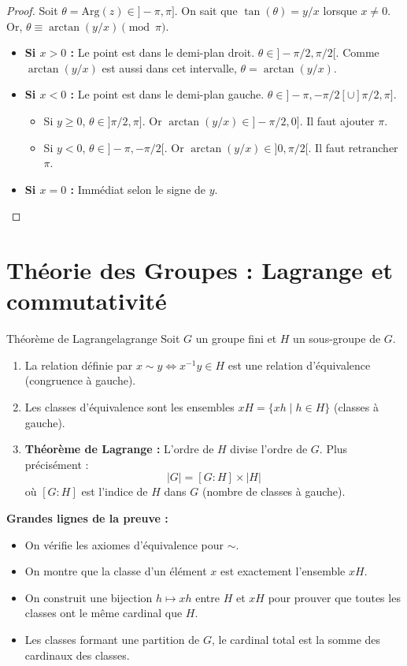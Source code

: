 \documentclass{prepacours}
\begin{document}
\begin{proof}
    Soit $\theta = \text{Arg}(z) \in ]-\pi, \pi]$. On sait que $\tan(\theta) = y/x$ lorsque $x \neq 0$.
    Or, $\theta \equiv \arctan(y/x) \pmod \pi$.
    \begin{itemize}
        \item \textbf{Si $x > 0$ :} Le point est dans le demi-plan droit. $\theta \in ]-\pi/2, \pi/2[$. Comme $\arctan(y/x)$ est aussi dans cet intervalle, $\theta = \arctan(y/x)$.
        \item \textbf{Si $x < 0$ :} Le point est dans le demi-plan gauche. $\theta \in ]-\pi, -\pi/2[ \cup ]\pi/2, \pi]$.
        \begin{itemize}
            \item Si $y \ge 0$, $\theta \in ]\pi/2, \pi]$. Or $\arctan(y/x) \in ]-\pi/2, 0]$. Il faut ajouter $\pi$.
            \item Si $y < 0$, $\theta \in ]-\pi, -\pi/2[$. Or $\arctan(y/x) \in ]0, \pi/2[$. Il faut retrancher $\pi$.
        \end{itemize}
        \item \textbf{Si $x=0$ :} Immédiat selon le signe de $y$.
    \end{itemize}
\end{proof}


\section{Théorie des Groupes : Lagrange et commutativité}

\begin{proposition}{Théorème de Lagrange}{lagrange}
    Soit $G$ un groupe fini et $H$ un sous-groupe de $G$.
    \begin{enumerate}
        \item La relation définie par $x \sim y \iff x^{-1}y \in H$ est une relation d'équivalence (congruence à gauche).
        \item Les classes d'équivalence sont les ensembles $xH = \{xh \mid h \in H\}$ (classes à gauche).
        \item \textbf{Théorème de Lagrange :} L'ordre de $H$ divise l'ordre de $G$. Plus précisément :
        \[ |G| = [G:H] \times |H| \]
        où $[G:H]$ est l'indice de $H$ dans $G$ (nombre de classes à gauche).
    \end{enumerate}
\end{proposition}

\noindent \textbf{Grandes lignes de la preuve :}
\begin{itemize}
    \item On vérifie les axiomes d'équivalence pour $\sim$.
    \item On montre que la classe d'un élément $x$ est exactement l'ensemble $xH$.
    \item On construit une bijection $h \mapsto xh$ entre $H$ et $xH$ pour prouver que toutes les classes ont le même cardinal que $H$.
    \item Les classes formant une partition de $G$, le cardinal total est la somme des cardinaux des classes.
\end{itemize}
\end{document}
